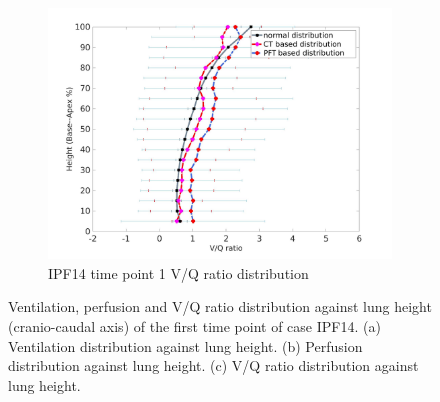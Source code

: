 \begin{figure}[htbp]
\begin{subfigure}{.6\linewidth}
  \includegraphics[width=\linewidth,trim={{.0\wd0} {.0\wd0} {.0\wd0} {.0\wd0}},clip]{Appendix/Image_AppexB/IPF1401/IPF1401_VQAgainstLungHeight.png}
  \caption{IPF14 time point 1 V/Q ratio distribution}
  \label{fig:IPF1401VQDistribution-c}
\end{subfigure}
\caption{ Ventilation, perfusion and V/Q ratio distribution against lung height (cranio-caudal axis) of the first time point of case IPF14. (a) Ventilation distribution against lung height. (b) Perfusion distribution against lung height. (c) V/Q ratio distribution against lung height.}
\label{fig:IPF1401VQDistribution}
\end{figure}

